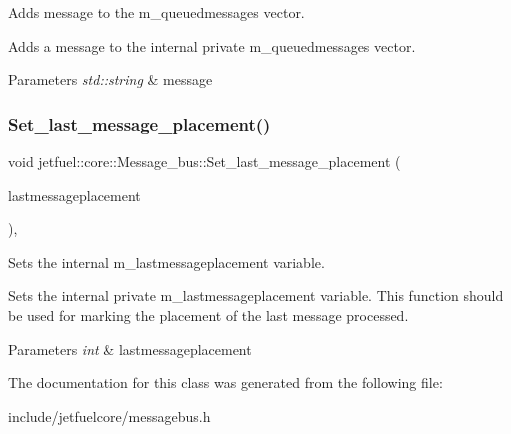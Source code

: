 Adds message to the m\+\_\+queuedmessages vector. 

Adds a message to the internal private m\+\_\+queuedmessages vector.


\begin{DoxyParams}{Parameters}
{\em std\+::string} & message \\
\hline
\end{DoxyParams}
\mbox{\label{classjetfuel_1_1core_1_1Message__bus_a12c40043878677d0dbb5e9897f48d08f}} 
\subsubsection{\texorpdfstring{Set\+\_\+last\+\_\+message\+\_\+placement()}{Set\_last\_message\_placement()}}
{\footnotesize\ttfamily void jetfuel\+::core\+::\+Message\+\_\+bus\+::\+Set\+\_\+last\+\_\+message\+\_\+placement (\begin{DoxyParamCaption}\item[{const int}]{lastmessageplacement }\end{DoxyParamCaption})\hspace{0.3cm}{\ttfamily [inline]}, {\ttfamily [protected]}}



Sets the internal m\+\_\+lastmessageplacement variable. 

Sets the internal private m\+\_\+lastmessageplacement variable. This function should be used for marking the placement of the last message processed.


\begin{DoxyParams}{Parameters}
{\em int} & lastmessageplacement \\
\hline
\end{DoxyParams}


The documentation for this class was generated from the following file\+:\begin{DoxyCompactItemize}
\item 
include/jetfuelcore/messagebus.\+h\end{DoxyCompactItemize}
